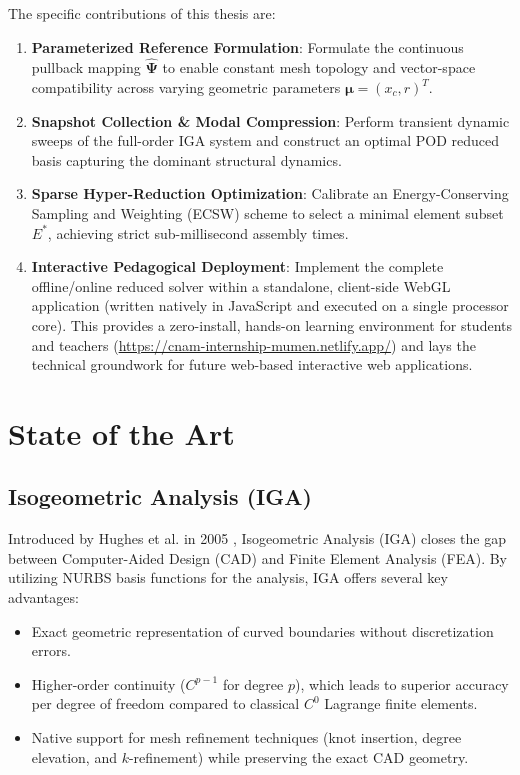 The specific contributions of this thesis are:

\begin{enumerate}[leftmargin=*]
    \item \textbf{Parameterized Reference Formulation}: Formulate the continuous pullback mapping $\hat{\boldsymbol{\Psi}}$ to enable constant mesh topology and vector-space compatibility across varying geometric parameters $\boldsymbol{\mu} = (x_c, r)^T$.
    \item \textbf{Snapshot Collection \& Modal Compression}: Perform transient dynamic sweeps of the full-order IGA system and construct an optimal POD reduced basis capturing the dominant structural dynamics.
    \item \textbf{Sparse Hyper-Reduction Optimization}: Calibrate an Energy-Conserving Sampling and Weighting (ECSW) scheme to select a minimal element subset $E^*$, achieving strict sub-millisecond assembly times.
    \item \textbf{Interactive Pedagogical Deployment}: Implement the complete offline/online reduced solver within a standalone, client-side WebGL application (written natively in JavaScript and executed on a single processor core). This provides a zero-install, hands-on learning environment for students and teachers (\url{https://cnam-internship-mumen.netlify.app/}) and lays the technical groundwork for future web-based interactive web applications.
\end{enumerate}

\section{State of the Art}

\subsection{Isogeometric Analysis (IGA)}
Introduced by Hughes et al. in 2005 \cite{hughes2005}, Isogeometric Analysis (IGA) closes the gap between Computer-Aided Design (CAD) and Finite Element Analysis (FEA). By utilizing NURBS basis functions for the analysis, IGA offers several key advantages:
\begin{itemize}[leftmargin=*]
    \item Exact geometric representation of curved boundaries without discretization errors.
    \item Higher-order continuity ($C^{p-1}$ for degree $p$), which leads to superior accuracy per degree of freedom compared to classical $C^0$ Lagrange finite elements.
    \item Native support for mesh refinement techniques (knot insertion, degree elevation, and $k$-refinement) while preserving the exact CAD geometry.
\end{itemize}

